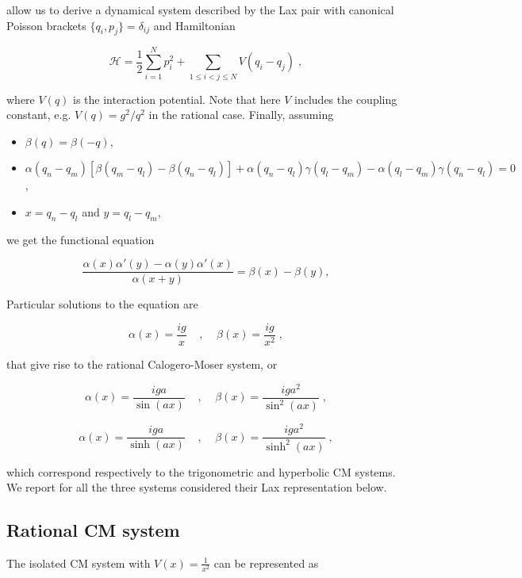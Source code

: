 allow us to derive a dynamical system described by the Lax pair with canonical Poisson brackets $\{q_i, p_j\} = \delta_{ij}$ and Hamiltonian

\begin{equation*}
    \mathcal{H} = \frac{1}{2}\sum_{i = 1}^N p_i^2 + \sum_{1 \leq i < j \leq N} V(q_i - q_j)\;,
\end{equation*}

where $V(q)$ is the interaction potential. Note that here $V$ includes the coupling constant, e.g. $V(q) = g^2/q^2$ in the rational case. Finally, assuming

\begin{itemize}
    \item $\beta(q) = \beta(-q)$,
    \item $\alpha(q_n - q_m)[\beta(q_m - q_l) - \beta(q_n - q_l)] + \alpha(q_n - q_l)\gamma(q_l - q_m) - \alpha(q_l - q_m)\gamma(q_n - q_l) = 0$,
    \item $x = q_n - q_l$ and $y = q_l - q_m$,
\end{itemize}

we get the functional equation

\begin{equation}\label{laxfunctionalequations}
    \frac{\alpha(x) \alpha'(y) - \alpha(y) \alpha'(x)}{\alpha(x+y)} = \beta(x) - \beta(y),  
\end{equation}

Particular solutions to the equation are

\begin{equation}
    \alpha(x) = \frac{ig}{x}\;\;\;\;,\;\;\;\;\beta(x) = \frac{ig}{x^2}\;,
\end{equation}

that give rise to the rational Calogero-Moser system, or 

\begin{equation}
    \alpha(x) = \frac{iga}{\sin{(ax)}}\;\;\;\;,\;\;\;\;\beta(x) = \frac{iga^2}{\sin^2{(ax)}}\;,
\end{equation}

\begin{equation}
    \alpha(x) = \frac{iga}{\sinh{(ax)}}\;\;\;\;,\;\;\;\;\beta(x) = \frac{iga^2}{\sinh^2{(ax)}}\;,
\end{equation}

which correspond respectively to the trigonometric and hyperbolic CM systems. We report for all the three systems considered their Lax representation below.

\subsection{Rational CM system}
The isolated CM system with $V(x) = \frac{1}{x^2}$ can be represented as

